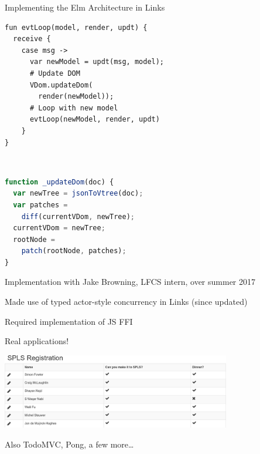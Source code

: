 \documentclass[11.5pt, aspectratio=169]{beamer}
\begin{document}
\begin{frame}[fragile]{Implementing the Elm Architecture in Links}

  \begin{minipage}{0.475\textwidth}
  \begin{lstlisting}[language=links]
fun evtLoop(model, render, updt) {
  receive {
    case msg ->
      var newModel = updt(msg, model);
      # Update DOM
      VDom.updateDom(
        render(newModel));
      # Loop with new model
      evtLoop(newModel, render, updt)
    }
}
\end{lstlisting}
\end{minipage}
~\hfill
\begin{minipage}{0.5\textwidth}
\begin{lstlisting}[language=JavaScript]
function _updateDom(doc) {
  var newTree = jsonToVtree(doc);
  var patches =
    diff(currentVDom, newTree);
  currentVDom = newTree;
  rootNode =
    patch(rootNode, patches);
}
\end{lstlisting}
\end{minipage}

  \begin{fullpageitemize}
  \item Implementation with Jake Browning, LFCS intern, over summer 2017
  \item Made use of typed actor-style concurrency in Links (since updated)
  \item Required implementation of JS FFI
  \end{fullpageitemize}
\end{frame}

\begin{frame}{Real applications!}

  \begin{center}
    \includegraphics[width=0.75\textwidth]{images/spls-reg.png}
  \end{center}

  \begin{itemize}
    \itemR Also TodoMVC, Pong, a few more\ldots
  \end{itemize}
\end{frame}
\end{document}
